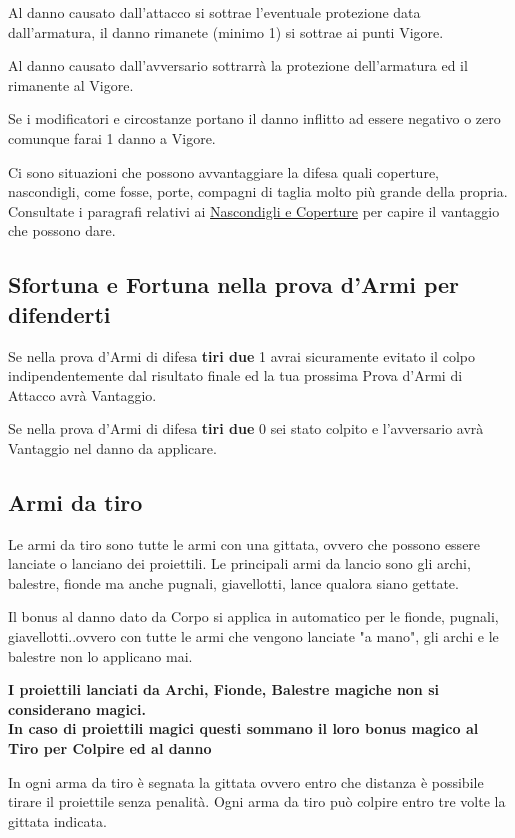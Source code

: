 \documentclass[12pt,a4paper,twoside,openany]{book}
\begin{document}
\begin{multicols}{2}
Al danno causato dall'attacco si sottrae l'eventuale protezione data dall'armatura, il danno rimanete (minimo 1) si sottrae ai punti Vigore.

Al danno causato dall'avversario sottrarrà la protezione dell'armatura ed il rimanente al Vigore.

Se i modificatori e circostanze portano il danno inflitto ad essere negativo o zero comunque farai 1 danno a Vigore.

Ci sono situazioni che possono avvantaggiare la difesa quali coperture, nascondigli, come fosse, porte, compagni di taglia molto più grande della propria. Consultate i paragrafi relativi ai \hyperlink{coperture}{Nascondigli e Coperture} per capire il vantaggio che possono dare.

\subsection{Sfortuna e Fortuna nella prova d'Armi per difenderti}

Se nella prova d'Armi di difesa \textbf{tiri due} 1 avrai sicuramente evitato il colpo indipendentemente dal risultato finale ed la tua prossima Prova d'Armi di Attacco avrà Vantaggio.

Se nella prova d'Armi di difesa \textbf{tiri due} 0 sei stato colpito e l'avversario avrà Vantaggio nel danno da applicare.

\subsection{Armi da tiro}\label{armidatiro}

Le armi da tiro sono tutte le armi con una gittata, ovvero che possono essere lanciate o lanciano dei proiettili. Le principali armi da lancio sono gli archi, balestre, fionde ma anche pugnali, giavellotti, lance qualora siano gettate.

Il bonus al danno dato da Corpo si applica in automatico per le fionde, pugnali, giavellotti..ovvero con tutte le armi che vengono lanciate "a mano", gli archi e le balestre non lo applicano mai.

\textbf{I proiettili lanciati da Archi, Fionde, Balestre magiche non si considerano magici.\\
In caso di proiettili magici questi sommano il loro bonus magico al Tiro per Colpire ed al danno}

In ogni arma da tiro è segnata la gittata ovvero entro che distanza è possibile tirare il proiettile senza penalità. Ogni arma da tiro può colpire entro tre volte la gittata indicata.


\end{multicols}
\end{document}
